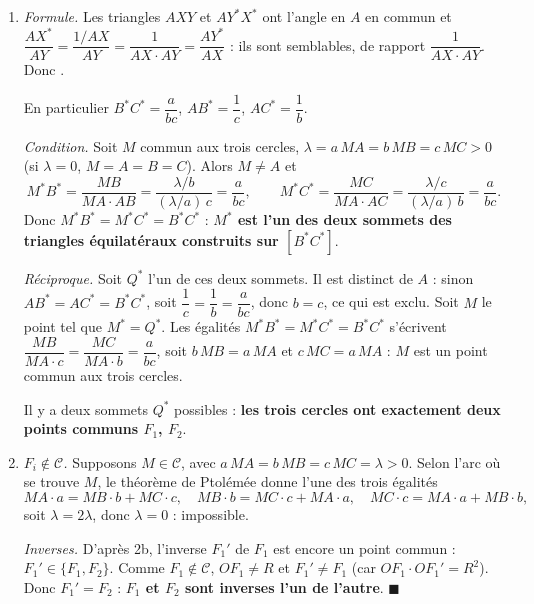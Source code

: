 \begin{enumerate}[itemsep=14pt]
\begin{enumerate}[itemsep=8pt]
    $M\in\Gamma_1\iff c\,MC=b\,MB$ et $M\in\Gamma_2\iff a\,MA=c\,MC$. Donc $M\in\Gamma_1\cap\Gamma_2\iff a\,MA=b\,MB=c\,MC$, et d'après la question 1b, c'est aussi $M\in\Gamma_3$. Réciproquement, $a\,MA=b\,MB=c\,MC$ donne les trois rapports.

    \item \emph{Formule.} Les triangles $AXY$ et $AY^*X^*$ ont l'angle en $A$ en commun et $\dfrac{AX^*}{AY}=\dfrac{1/AX}{AY}=\dfrac1{AX\cdot AY}=\dfrac{AY^*}{AX}$ : ils sont semblables, de rapport $\dfrac1{AX\cdot AY}$. Donc .

    En particulier $B^*C^*=\dfrac a{bc}$, $AB^*=\dfrac1c$, $AC^*=\dfrac1b$.

    \emph{Condition.} Soit $M$ commun aux trois cercles, $\lambda=a\,MA=b\,MB=c\,MC>0$ (si $\lambda=0$, $M=A=B=C$). Alors $M\neq A$ et
    \[M^*B^*=\dfrac{MB}{MA\cdot AB}=\dfrac{\lambda/b}{(\lambda/a)\,c}=\dfrac a{bc},\qquad M^*C^*=\dfrac{MC}{MA\cdot AC}=\dfrac{\lambda/c}{(\lambda/a)\,b}=\dfrac a{bc}.\]
    Donc $M^*B^*=M^*C^*=B^*C^*$ : \textbf{$M^*$ est l'un des deux sommets des triangles équilatéraux construits sur $[B^*C^*]$}.

    \emph{Réciproque.} Soit $Q^*$ l'un de ces deux sommets. Il est distinct de $A$ : sinon $AB^*=AC^*=B^*C^*$, soit $\dfrac1c=\dfrac1b=\dfrac a{bc}$, donc $b=c$, ce qui est exclu. Soit $M$ le point tel que $M^*=Q^*$. Les égalités $M^*B^*=M^*C^*=B^*C^*$ s'écrivent $\dfrac{MB}{MA\cdot c}=\dfrac{MC}{MA\cdot b}=\dfrac a{bc}$, soit $b\,MB=a\,MA$ et $c\,MC=a\,MA$ : $M$ est un point commun aux trois cercles.

    Il y a deux sommets $Q^*$ possibles : \textbf{les trois cercles ont exactement deux points communs $F_1$, $F_2$}.

    \item \emph{$F_i\notin\mathcal C$.} Supposons $M\in\mathcal C$, avec $a\,MA=b\,MB=c\,MC=\lambda>0$. Selon l'arc où se trouve $M$, le théorème de Ptolémée donne l'une des trois égalités
    \[MA\cdot a=MB\cdot b+MC\cdot c,\quad MB\cdot b=MC\cdot c+MA\cdot a,\quad MC\cdot c=MA\cdot a+MB\cdot b,\]
    soit $\lambda=2\lambda$, donc $\lambda=0$ : impossible.

    \emph{Inverses.} D'après 2b, l'inverse $F_1'$ de $F_1$ est encore un point commun : $F_1'\in\{F_1,F_2\}$. Comme $F_1\notin\mathcal C$, $OF_1\neq R$ et $F_1'\neq F_1$ (car $OF_1\cdot OF_1'=R^2$). Donc $F_1'=F_2$ : \textbf{$F_1$ et $F_2$ sont inverses l'un de l'autre}. $\blacksquare$
  \end{enumerate}
\end{enumerate}

